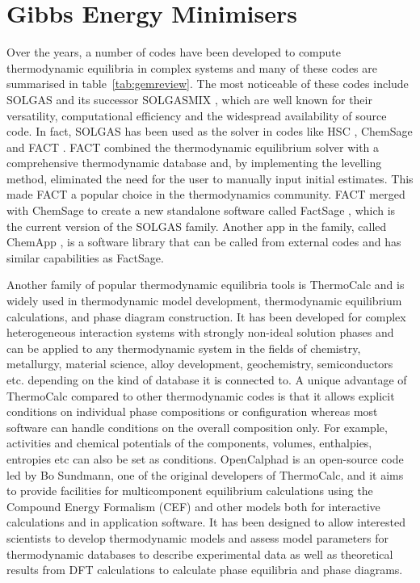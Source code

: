 \section{Gibbs Energy Minimisers}
	Over the years, a number of codes have been developed to compute thermodynamic equilibria in complex systems and many of these codes are summarised in table~\ref{tab:gemreview}. The most noticeable of these codes include SOLGAS \cite{Eriksson71} and its successor SOLGASMIX \cite{Eriksson:1975aa}, which are well known for their versatility, computational efficiency and the widespread availability of source code. In fact, SOLGAS has been used as the solver in codes like HSC \cite{HSCSoftware:aa}, ChemSage \cite{Eriksson90} and FACT \cite{Thompson83}. FACT combined the thermodynamic equilibrium solver with a comprehensive thermodynamic database and, by implementing the levelling method, eliminated the need for the user to manually input initial estimates. This made FACT a popular choice in the thermodynamics community. FACT merged with ChemSage to create a new standalone software called FactSage \cite{Bale02}, which is the current version of the SOLGAS family. Another app in the family, called ChemApp \cite{Eriksson:2008aa,Petersen:2007aa}, is a software library that can be called from external codes and has similar capabilities as FactSage.

	Another family of popular thermodynamic equilibria tools is ThermoCalc \cite{ANDERSSON2002273} and is widely used in thermodynamic model development, thermodynamic equilibrium calculations, and  phase diagram construction. It has been developed for complex heterogeneous interaction systems with strongly non-ideal solution phases and can be applied to any thermodynamic system in the fields of chemistry, metallurgy, material science, alloy development, geochemistry, semiconductors etc. depending on the kind of database it is connected to. A unique advantage of ThermoCalc compared to other thermodynamic codes is that it allows explicit conditions on individual phase compositions or configuration whereas most software can handle conditions on the overall composition only. For example, activities and chemical potentials of the components, volumes, enthalpies, entropies etc can also be set as conditions.  OpenCalphad \cite{Sundman:2015aa} is an open-source code led by Bo Sundmann, one of the original developers of ThermoCalc, and it aims to provide facilities for multicomponent equilibrium calculations using the Compound Energy Formalism (CEF) and other models both for interactive calculations and in application software. It has been designed to allow interested scientists to develop thermodynamic models and assess model parameters for thermodynamic databases to describe experimental data as well as theoretical results from DFT calculations to calculate phase equilibria and phase diagrams.

